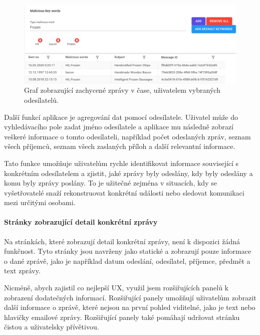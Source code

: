        \begin{figure}[H]
            \centering
            \includegraphics[scale=0.25]{obrazky-figures/Implementace/Blazor/MaliciousWords.png}
            \caption{Graf zobrazující zachycené zprávy v čase, uživatelem vybraných odesílatelů.}
            \label{fig:tableFilterOperators}
        \end{figure}
        
        Další funkcí aplikace je agregování dat pomocí odesílatele. Uživatel může do vyhledávacího pole zadat jméno odesílatele a aplikace mu následně zobrazí veškeré informace o tomto odesílateli, například počet odeslaných zpráv, seznam všech příjemců, seznam všech zaslaných příloh a další relevantní informace.

        Tato funkce umožňuje uživatelům rychle identifikovat informace související s konkrétním odesílatelem a zjistit, jaké zprávy byly odeslány, kdy byly odeslány a komu byly zprávy poslány. To je užitečné zejména v situacích, kdy se vyšetřovatelé snaží rekonstruovat konkrétní události nebo sledovat komunikaci mezi určitými osobami.
    
        \paragraph{Stránky zobrazující detail konkrétní zprávy}        
        Na stránkách, které zobrazují detail konkrétní zprávy, není k dispozici žádná funkčnost. Tyto stránky jsou navrženy jako statické a zobrazují pouze informace o dané zprávě, jako je například datum odeslání, odesílatel, příjemce, předmět a text zprávy.

        Nicméně, abych zajistil co nejlepší \gls{UX}, využil jsem rozšiřujících panelů k zobrazení dodatečných informací. Rozšiřující panely umožňují uživatelům zobrazit další informace o zprávě, které nejsou na první pohled viditelné, jako je text nebo hlavičky emailové zprávy. Rozšiřující panely také pomáhají udržovat stránku čistou a uživatelsky přívětivou.
    
